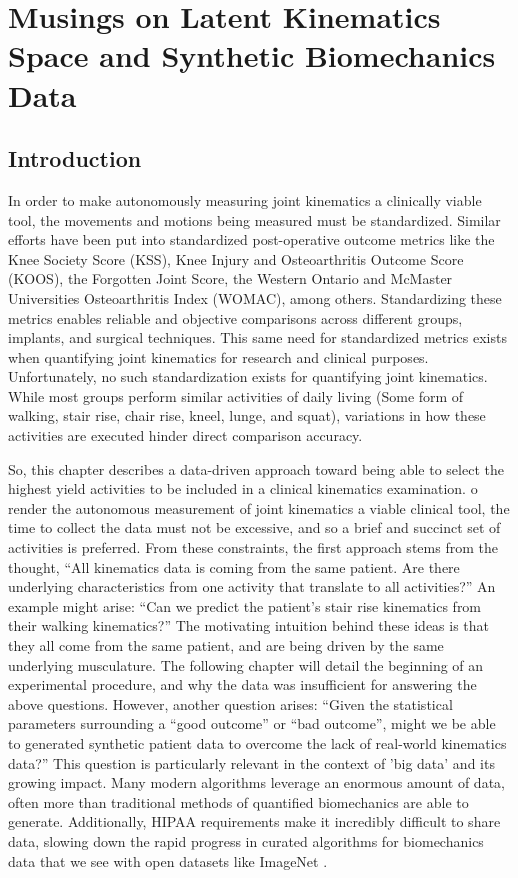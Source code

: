 \chapter{Musings on Latent Kinematics Space and Synthetic Biomechanics Data}

\section{Introduction}
In order to make autonomously measuring joint kinematics a clinically viable tool, the movements and motions being measured must be standardized.
Similar efforts have been put into standardized post-operative outcome metrics like the Knee Society Score (KSS), Knee Injury and Osteoarthritis Outcome Score (KOOS), the Forgotten Joint Score, the Western Ontario and McMaster Universities Osteoarthritis Index (WOMAC), among others.
Standardizing these metrics enables reliable and objective comparisons across different groups, implants, and surgical techniques.
This same need for standardized metrics exists when quantifying joint kinematics for research and clinical purposes.
Unfortunately, no such standardization exists for quantifying joint kinematics.
While most groups perform similar activities of daily living (Some form of walking, stair rise, chair rise, kneel, lunge, and squat), variations in how these activities are executed hinder direct comparison accuracy.

So, this chapter describes a data-driven approach toward being able to select the highest yield activities to be included in a clinical kinematics examination.
o render the autonomous measurement of joint kinematics a viable clinical tool, the time to collect the data must not be excessive, and so a brief and succinct set of activities is preferred.
From these constraints, the first approach stems from the thought, ``All kinematics data is coming from the same patient. Are there underlying characteristics from one activity that translate to all activities?''
An example might arise: ``Can we predict the patient's stair rise kinematics from their walking kinematics?''
The motivating intuition behind these ideas is that they all come from the same patient, and are being driven by the same underlying musculature.
The following chapter will detail the beginning of an experimental procedure, and why the data was insufficient for answering the above questions.
However, another question arises: ``Given the statistical parameters surrounding a ``good outcome'' or ``bad outcome'', might we be able to generated synthetic patient data to overcome the lack of real-world kinematics data?''
This question is particularly relevant in the context of 'big data' and its growing impact.
Many modern algorithms leverage an enormous amount of data, often more than traditional methods of quantified biomechanics are able to generate.
Additionally, HIPAA requirements make it incredibly difficult to share data, slowing down the rapid progress in curated algorithms for biomechanics data that we see with open datasets like ImageNet \cite{russakovskyImageNetLargeScale2015}.

